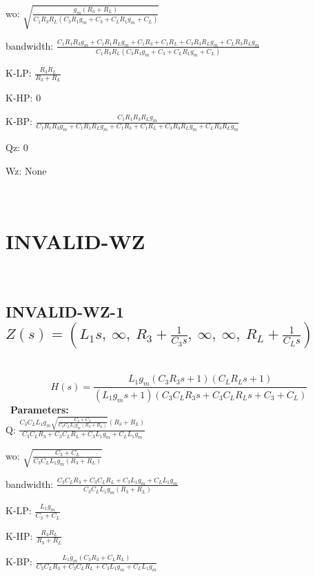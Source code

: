\documentclass{article}
\begin{document}
wo: $\sqrt{\frac{g_{m} \left(R_{3} + R_{L}\right)}{C_{1} R_{3} R_{L} \left(C_{3} R_{1} g_{m} + C_{3} + C_{L} R_{1} g_{m} + C_{L}\right)}}$\ 

bandwidth: $\frac{C_{1} R_{1} R_{3} g_{m} + C_{1} R_{1} R_{L} g_{m} + C_{1} R_{3} + C_{1} R_{L} + C_{3} R_{3} R_{L} g_{m} + C_{L} R_{3} R_{L} g_{m}}{C_{1} R_{3} R_{L} \left(C_{3} R_{1} g_{m} + C_{3} + C_{L} R_{1} g_{m} + C_{L}\right)}$\ 

K-LP: $\frac{R_{3} R_{L}}{R_{3} + R_{L}}$\ 

K-HP: $0$\ 

K-BP: $\frac{C_{1} R_{1} R_{3} R_{L} g_{m}}{C_{1} R_{1} R_{3} g_{m} + C_{1} R_{1} R_{L} g_{m} + C_{1} R_{3} + C_{1} R_{L} + C_{3} R_{3} R_{L} g_{m} + C_{L} R_{3} R_{L} g_{m}}$\ 

Qz: $0$\ 

Wz: $\text{None}$\ 

\ 

\section{INVALID-WZ}\ 
\subsection{INVALID-WZ-1 $Z(s) = \left( L_{1} s, \  \infty, \  R_{3} + \frac{1}{C_{3} s}, \  \infty, \  \infty, \  R_{L} + \frac{1}{C_{L} s}\right)$ } \ 
\textbf{\[H(s) = \frac{L_{1} g_{m} \left(C_{3} R_{3} s + 1\right) \left(C_{L} R_{L} s + 1\right)}{\left(L_{1} g_{m} s + 1\right) \left(C_{3} C_{L} R_{3} s + C_{3} C_{L} R_{L} s + C_{3} + C_{L}\right)}\] } \ 
\textbf{Parameters:}\\ 

Q: $\frac{C_{3} C_{L} L_{1} g_{m} \sqrt{\frac{C_{3} + C_{L}}{C_{3} C_{L} L_{1} g_{m} \left(R_{3} + R_{L}\right)}} \left(R_{3} + R_{L}\right)}{C_{3} C_{L} R_{3} + C_{3} C_{L} R_{L} + C_{3} L_{1} g_{m} + C_{L} L_{1} g_{m}}$\ 

wo: $\sqrt{\frac{C_{3} + C_{L}}{C_{3} C_{L} L_{1} g_{m} \left(R_{3} + R_{L}\right)}}$\ 

bandwidth: $\frac{C_{3} C_{L} R_{3} + C_{3} C_{L} R_{L} + C_{3} L_{1} g_{m} + C_{L} L_{1} g_{m}}{C_{3} C_{L} L_{1} g_{m} \left(R_{3} + R_{L}\right)}$\ 

K-LP: $\frac{L_{1} g_{m}}{C_{3} + C_{L}}$\ 

K-HP: $\frac{R_{3} R_{L}}{R_{3} + R_{L}}$\ 

K-BP: $\frac{L_{1} g_{m} \left(C_{3} R_{3} + C_{L} R_{L}\right)}{C_{3} C_{L} R_{3} + C_{3} C_{L} R_{L} + C_{3} L_{1} g_{m} + C_{L} L_{1} g_{m}}$\ 
\end{document}
